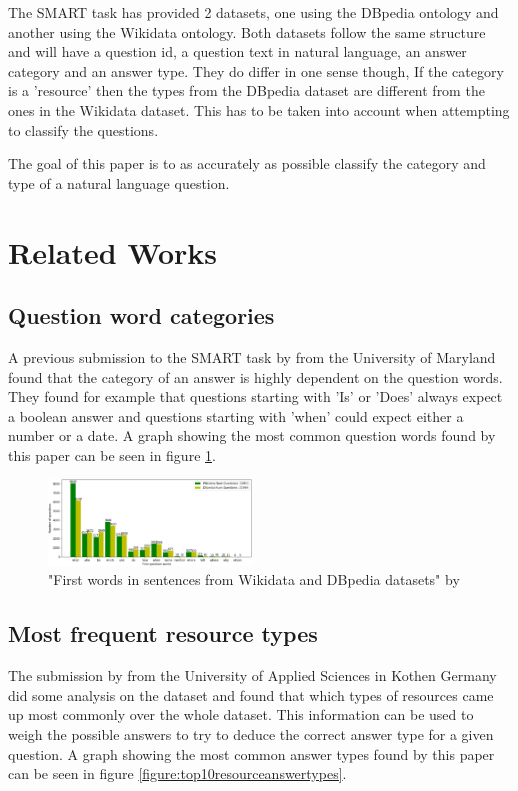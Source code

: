 \documentclass[sigconf]{acmart}
\begin{document}
The \gls{SMART} task has provided 2 datasets, one using the DBpedia ontology and another using the Wikidata ontology.
Both datasets follow the same structure and will have a question id, a question text in natural language, an answer category and an answer type. They do differ in one sense though, If the category is a 'resource' then the types from the DBpedia dataset are different from the ones in the Wikidata dataset. This has to be taken into account when attempting to classify the questions.

The goal of this paper is to as accurately as possible classify the category and type of a natural language question.



\section{Related Works}
\subsection{Question word categories}
A previous submission to the \gls{SMART} task by \citet{Maryland:qwords} from the University of Maryland found that the category of an answer is highly dependent on the question words. They found for example that questions starting with 'Is' or 'Does' always expect a boolean answer and questions starting with 'when' could expect either a number or a date\cite{Maryland:qwords}. A graph showing the most common question words found by this paper can be seen in figure \ref{figure:firstquestionwords}. 

\begin{figure}[h]
    \includegraphics[width=0.48\textwidth]{figures/firstQuestionWords.png}
    \caption{"First words in sentences from Wikidata and DBpedia datasets" by \citet{Maryland:qwords}}
    \label{figure:firstquestionwords}
\end{figure}

\subsection{Most frequent resource types}
The submission by \citet{Kothen:analysis} from the University of Applied Sciences in Kothen Germany did some analysis on the dataset and found that which types of resources came up most commonly over the whole dataset. This information can be used to weigh the possible answers to try to deduce the correct answer type for a given question\cite{Kothen:analysis}. A graph showing the most common answer types found by this paper can be seen in figure \ref{figure:top10resourceanswertypes}.
\end{document}
